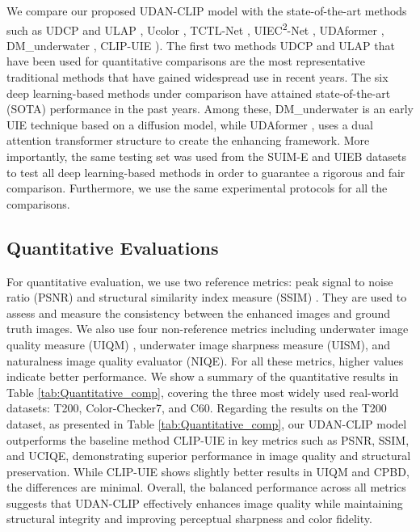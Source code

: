 \documentclass[3p,12pt,authoryear]{elsarticle}
\begin{document}
We compare our proposed UDAN-CLIP model with the state-of-the-art methods such as UDCP \cite{6755982} and ULAP \cite{10.1007/978-3-030-00776-8_62}, Ucolor \cite{9426457}, TCTL-Net \cite{10298280}, UIEC\textsuperscript{2}-Net \cite{WANG2021116250}, UDAformer \cite{SHEN202377}, DM\_underwater \cite{10.1145/3581783.3612378}, CLIP-UIE \cite{liu2024underwaterimageenhancementdiffusion}). The first two methods UDCP \cite{6755982} and ULAP \cite{10.1007/978-3-030-00776-8_62} that have been used for quantitative comparisons are the most representative traditional methods that have gained widespread use in recent years. The six deep learning-based methods under comparison have attained state-of-the-art (SOTA) performance in the past years. Among these, DM\_underwater \cite{10.1145/3581783.3612378} is an early UIE technique based on a diffusion model, while UDAformer \cite{SHEN202377}, uses a dual attention transformer structure to create the enhancing framework. More importantly, the same testing set was used from the SUIM-E and UIEB datasets to test all deep learning-based methods in order to guarantee a rigorous and fair comparison. Furthermore, we use the same experimental protocols for all the comparisons.
 
\subsection{Quantitative Evaluations}
For quantitative evaluation, we use two reference metrics: peak signal to noise ratio (PSNR) \cite{a65} and structural similarity index measure (SSIM) \cite{a66}. They are used to assess and measure the consistency between the enhanced images and ground truth images. We also use four non-reference metrics including underwater image quality measure (UIQM) \cite{a66}, underwater image sharpness measure (UISM), and naturalness image quality evaluator (NIQE). For all these metrics, higher values indicate better performance. We show a summary of the quantitative results in Table \ref{tab:Quantitative_comp}, covering the three most widely used real-world datasets: T200, Color-Checker7, and C60. Regarding the results on the T200 dataset, as presented in Table \ref{tab:Quantitative_comp}, our UDAN-CLIP model outperforms the baseline method CLIP-UIE \cite{liu2024underwaterimageenhancementdiffusion} in key metrics such as PSNR, SSIM, and UCIQE, demonstrating superior performance in image quality and structural preservation. While CLIP-UIE shows slightly better results in UIQM and CPBD, the differences are minimal. Overall, the balanced performance across all metrics suggests that UDAN-CLIP effectively enhances image quality while maintaining structural integrity and improving perceptual sharpness and color fidelity.
\end{document}

